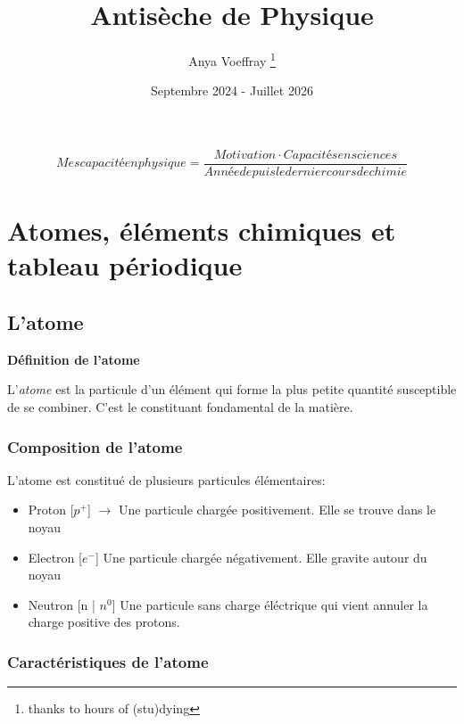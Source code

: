 \documentclass{article}
\title{Antisèche de Physique}
\author{Anya Voeffray \thanks{thanks to hours of (stu)dying}}
\date{Septembre 2024 - Juillet 2026}
\begin{document}
\begin{titlepage}
\maketitle

\begin{equation}
  Mes capacité en physique = \frac{Motivation \cdot Capacités en sciences}{Année depuis le dernier cours de chimie}
\end{equation}

\end{titlepage}


\section{Atomes, éléments chimiques et tableau périodique}

\subsection{L'atome}

\textbf{Définition de l'atome}

L'\textit{atome} est la particule d'un élément qui forme la plus petite quantité susceptible de se combiner.
C'est le constituant fondamental de la matière. 

\subsubsection{Composition de l'atome}

L'atome est constitué de plusieurs particules élémentaires:

\begin{itemize}
  \item Proton [$p^+$] $\rightarrow$ Une particule chargée positivement. Elle se trouve dans le noyau
  \item Electron [$e^-$] \rightarrow Une particule chargée négativement. Elle gravite autour du noyau
  \item Neutron [n | $n^0$] \rightarrow Une particule sans charge éléctrique qui vient annuler la charge positive des protons.
\end{itemize}

\subsubsection{Caractéristiques de l'atome}
\end{document}
